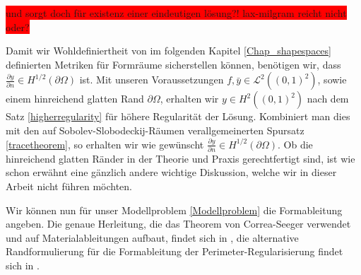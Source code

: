 \colorbox{red}{und sorgt doch für existenz einer eindeutigen lösung?! lax-milgram reicht nicht oder?}

Damit wir Wohldefiniertheit von im folgenden Kapitel \ref{Chap_shapespaces} definierten Metriken für Formräume sicherstellen können, benötigen wir, dass $\frac{\partial y}{\partial n} \in H^{1/2}(\partial\Omega)$ ist. Mit unseren Voraussetzungen $f,\bar{y} \in \mathcal{L}^2((0,1)^2)$, sowie einem hinreichend glatten Rand $\partial\Omega$, erhalten wir $y\in H^2((0,1)^2)$ nach dem Satz  \ref{higherregularity} für höhere Regularität der Lösung. Kombiniert man dies mit den auf Sobolev-Slobodeckij-Räumen verallgemeinerten Spursatz \ref{tracetheorem}, so erhalten wir wie gewünscht $\frac{\partial y}{\partial n} \in H^{1/2}(\partial\Omega)$. Ob die hinreichend glatten Ränder in der Theorie und Praxis gerechtfertigt sind, ist wie schon erwähnt eine gänzlich andere wichtige Diskussion, welche wir in dieser Arbeit nicht führen möchten.

Wir können nun für unser Modellproblem \ref{Modellproblem} die Formableitung angeben. Die genaue Herleitung, die das Theorem von Correa-Seeger verwendet und auf  Materialableitungen aufbaut, findet sich in \cite{shape_space}, die alternative Randformulierung für die Formableitung der Perimeter-Regularisierung findet sich in \cite{multigrid}.


